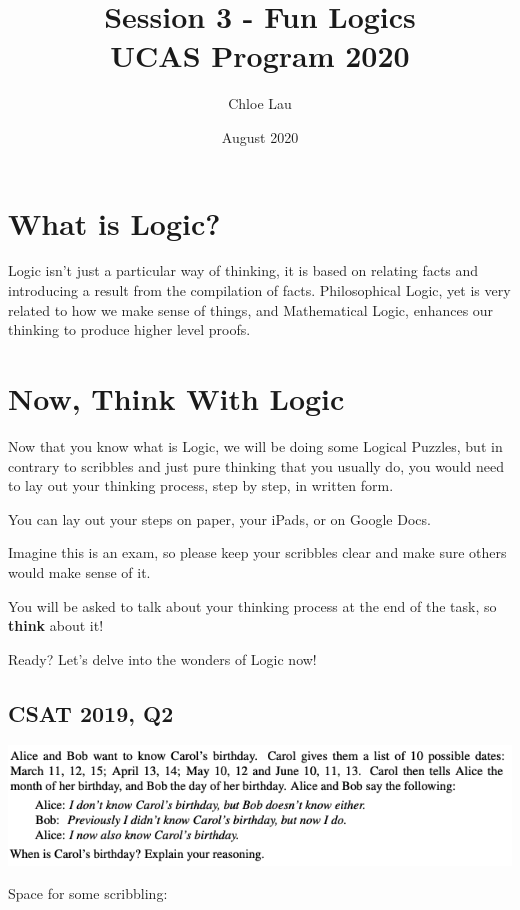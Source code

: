 \documentclass[12pt]{article}
\title{\vspace{-2cm} \textbf{Session 3 - Fun Logics} \\ UCAS Program 2020}
\author{Chloe Lau}
\date{August 2020}
\begin{document}
\setlength{\parindent}{4ex}
\setlength{\parskip}{1em}

\maketitle

\section{What is Logic?}
Logic isn't just a particular way of thinking, it is based on relating facts and introducing a result from the compilation of facts. Philosophical Logic, yet is very related to how we make sense of things, and Mathematical Logic, enhances our thinking to produce higher level proofs.

\section{Now, Think With Logic}
Now that you know what is Logic, we will be doing some Logical Puzzles, but in contrary to scribbles and just pure thinking that you usually do, you would need to lay out your thinking process, step by step, in written form.

You can lay out your steps on paper, your iPads, or on Google Docs.

Imagine this is an exam, so please keep your scribbles clear and make sure others would make sense of it.

You will be asked to talk about your thinking process at the end of the task, so \textbf{think} about it!

Ready? Let's delve into the wonders of Logic now!


\newpage
\subsection{CSAT 2019, Q2}
\begin{center}
    \includegraphics[scale=0.6]{csat19-2.png}
\end{center}

Space for some scribbling:

\newpage
\end{document}
